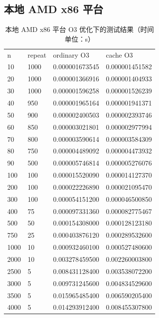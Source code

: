 \documentclass[a4paper]{article}
\begin{document}
\subsection{本地 AMD x86 平台}
\begin{table}[]
  \centering
  \begin{tabular}{llll}
    n    & repeat & ordinary O3    & cache O3       \\
    10   & 1000   & 0.000001673545 & 0.000001451582 \\
    20   & 1000   & 0.000001366916 & 0.000001404933 \\
    30   & 1000   & 0.000001596258 & 0.000001526239 \\
    40   & 950    & 0.000001965164 & 0.000001941371 \\
    50   & 900    & 0.000002400503 & 0.000002393746 \\
    60   & 850    & 0.000003021801 & 0.000002977994 \\
    70   & 800    & 0.000003590614 & 0.000003584309 \\
    80   & 750    & 0.000004489092 & 0.000004473932 \\
    90   & 500    & 0.000005746814 & 0.000005276076 \\
    100  & 100    & 0.000015520090 & 0.000014127370 \\
    200  & 100    & 0.000022226890 & 0.000021095470 \\
    300  & 100    & 0.000054151200 & 0.000046500850 \\
    400  & 75     & 0.000097331360 & 0.000082775467 \\
    500  & 50     & 0.000154308000 & 0.000128123180 \\
    750  & 25     & 0.000403876120 & 0.000289532600 \\
    1000 & 10     & 0.000932460100 & 0.000527480600 \\
    2000 & 10     & 0.003278459500 & 0.002260003800 \\
    2500 & 5      & 0.008431128400 & 0.003538072200 \\
    3000 & 5      & 0.009731245600 & 0.004834529600 \\
    3500 & 5      & 0.015965485400 & 0.006590205400 \\
    4000 & 5      & 0.014293912400 & 0.008455307800
  \end{tabular}
  \caption{本地 AMD x86 平台 O3 优化下的测试结果（时间单位：s）}
  \label{tab:x86-test}
\end{table}
\end{document}
